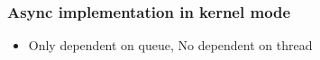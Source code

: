 \begin{frame}[fragile]
    \frametitle{Async implementation in kernel mode}
% 
% 
% 
% 
% 
% 
% 
    \begin{itemize}
        \item Only dependent on queue, No dependent on thread
    \end{itemize}

\end{frame}
